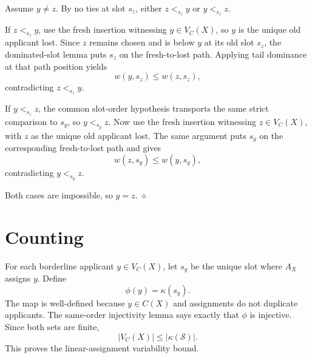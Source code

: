 \documentclass[11pt]{article}
\newenvironment{proof}{\par\noindent{\it Proof. }}{\hfill$\diamond$\par}
\newcommand{\Slots}{\mathcal S}
\newcommand{\chosen}{C}
\newcommand{\border}{V_{\chosen}}
\newcommand{\weight}{w}
\newcommand{\class}{\kappa}
\begin{document}
\begin{proof}
Assume $y\ne z$.  By no ties at slot $s_z$, either $z<_{s_z}y$ or
$y<_{s_z}z$.

If $z<_{s_z}y$, use the fresh insertion witnessing $y\in\border(X)$, so $y$ is
the unique old applicant lost.  Since $z$ remains chosen and is below $y$ at
its old slot $s_z$, the dominated-slot lemma puts $s_z$ on the fresh-to-lost
path.  Applying tail dominance at that path position yields
\[
  \weight(y,s_z)\le \weight(z,s_z),
\]
contradicting $z<_{s_z}y$.

If $y<_{s_z}z$, the common slot-order hypothesis transports the same strict
comparison to $s_y$, so $y<_{s_y}z$.  Now use the fresh insertion witnessing
$z\in\border(X)$, with $z$ as the unique old applicant lost.  The same argument
puts $s_y$ on the corresponding fresh-to-lost path and gives
\[
  \weight(z,s_y)\le \weight(y,s_y),
\]
contradicting $y<_{s_y}z$.

Both cases are impossible, so $y=z$.
\end{proof}

\section*{Counting}

For each borderline applicant $y\in\border(X)$, let $s_y$ be the unique slot
where $A_X$ assigns $y$.  Define
\[
  \phi(y)=\class(s_y).
\]
The map is well-defined because $y\in\chosen(X)$ and assignments do not
duplicate applicants.  The same-order injectivity lemma says exactly that
$\phi$ is injective.  Since both sets are finite,
\[
  |\border(X)| \le |\class(\Slots)|.
\]
This proves the linear-assignment variability bound.
\end{document}
